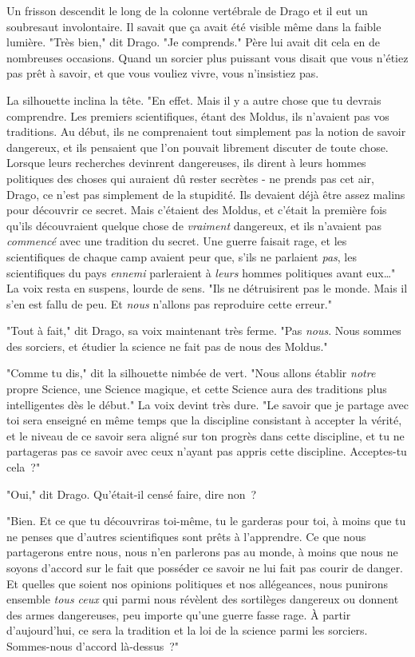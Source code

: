 Un frisson descendit le long de la colonne vertébrale de Drago et il eut un soubresaut involontaire. Il savait que ça avait été visible même dans la faible lumière. "Très bien," dit Drago. "Je comprends." Père lui avait dit cela en de nombreuses occasions. Quand un sorcier plus puissant vous disait que vous n'étiez pas prêt à savoir, et que vous vouliez vivre, vous n'insistiez pas.

La silhouette inclina la tête. "En effet. Mais il y a autre chose que tu devrais comprendre. Les premiers scientifiques, étant des Moldus, ils n'avaient pas vos traditions. Au début, ils ne comprenaient tout simplement pas la notion de savoir dangereux, et ils pensaient que l'on pouvait librement discuter de toute chose. Lorsque leurs recherches devinrent dangereuses, ils dirent à leurs hommes politiques des choses qui auraient dû rester secrètes - ne prends pas cet air, Drago, ce n'est pas simplement de la stupidité. Ils devaient déjà être assez malins pour découvrir ce secret. Mais c'étaient des Moldus, et c'était la première fois qu'ils découvraient quelque chose de \emph{vraiment} dangereux, et ils n'avaient pas \emph{commencé} avec une tradition du secret. Une guerre faisait rage, et les scientifiques de chaque camp avaient peur que, s'ils ne parlaient \emph{pas}, les scientifiques du pays \emph{ennemi} parleraient à \emph{leurs} hommes politiques avant eux…" La voix resta en suspens, lourde de sens. "Ils ne détruisirent pas le monde. Mais il s'en est fallu de peu. Et \emph{nous} n'allons pas reproduire cette erreur."

"Tout à fait," dit Drago, sa voix maintenant très ferme. "Pas \emph{nous}. Nous sommes des sorciers, et étudier la science ne fait pas de nous des Moldus."

"Comme tu dis," dit la silhouette nimbée de vert. "Nous allons établir \emph{notre} propre Science, une Science magique, et cette Science aura des traditions plus intelligentes dès le début." La voix devint très dure. "Le savoir que je partage avec toi sera enseigné en même temps que la discipline consistant à accepter la vérité, et le niveau de ce savoir sera aligné sur ton progrès dans cette discipline, et tu ne partageras pas ce savoir avec ceux n'ayant pas appris cette discipline. Acceptes-tu cela~?"

"Oui," dit Drago. Qu'était-il censé faire, dire non~?

"Bien. Et ce que tu découvriras toi-même, tu le garderas pour toi, à moins que tu ne penses que d'autres scientifiques sont prêts à l'apprendre. Ce que nous partagerons entre nous, nous n'en parlerons pas au monde, à moins que nous ne soyons d'accord sur le fait que posséder ce savoir ne lui fait pas courir de danger. Et quelles que soient nos opinions politiques et nos allégeances, nous punirons ensemble \emph{tous ceux} qui parmi nous révèlent des sortilèges dangereux ou donnent des armes dangereuses, peu importe qu'une guerre fasse rage. À partir d'aujourd'hui, ce sera la tradition et la loi de la science parmi les sorciers. Sommes-nous d'accord là-dessus~?"


